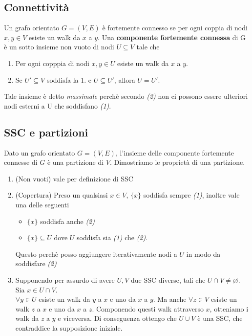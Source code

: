 \documentclass{article}
\begin{document}
\subsection*{Connettività}
Un grafo orientato \(G = (V,E)\) è fortemente connesso se per ogni coppia di nodi \(x,y \in V\) esiste un walk da \(x\) a \(y\).
Una \textbf{componente fortemente connessa} di G è un sotto insieme non vuoto di nodi \(U \subseteq V\) tale che
\begin{enumerate}
    \item Per ogni copppia di nodi \(x, y \in U\) esiste un walk da \(x\) a \(y\).
    \item Se \(U' \subseteq V\) soddisfa la 1. e \(U \subseteq U'\), allora \(U = U'\).
\end{enumerate}
Tale insieme è detto \emph{massimale} perchè secondo \emph{(2)} non ci possono essere ulteriori nodi esterni a U che soddisfano \emph{(1)}.
\subsection*{SSC e partizioni}
Dato un grafo orientato \(G = (V,E)\), l'insieme delle componente fortemente connesse di \(G\) è una partizione di \(V\). Dimostriamo le proprietà di una partizione.
\begin{enumerate}
    \item (Non vuoti) vale per definizione di SSC
    \item (Copertura) Preso un qualsiasi \(x \in V\), \(\{x\}\) soddisfa sempre \emph{(1)}, inoltre vale una delle seguenti
          \begin{itemize}
              \item \(\{x\}\) soddisfa anche \emph{(2)}
              \item \(\{x\} \subseteq U\) dove \(U\) soddisfa sia \emph{(1)} che \emph{(2)}.
          \end{itemize}
          Questo perchè posso aggiungere iterativamente nodi a \(U\) in modo da soddisfare \emph{(2)}
    \item Supponendo per assurdo di avere \(U,V\) due SSC diverse, tali che \(U \cap V \neq \varnothing\). Sia \(x \in U \cap V\). \\
          \(\forall y \in U\) esiste un walk da \(y\) a \(x\) e uno da \(x\) a \(y\). Ma anche \(\forall z \in V\) esiste un walk \(z\) a \(x\) e uno da \(x\) a \(z\). Componendo questi walk attraverso \(x\), otteniamo i walk da \(z\) a \(y\) e viceversa. Di conseguenza ottengo che \(U \cup V\) è una SSC, che contraddice la supposizione iniziale.
\end{enumerate}
\end{document}
